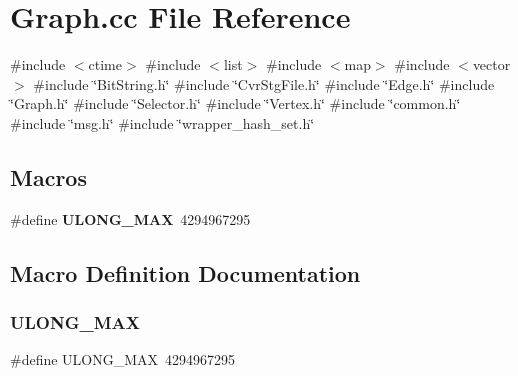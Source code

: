 \section{Graph.\+cc File Reference}
\label{Graph_8cc}
{\ttfamily \#include $<$ctime$>$}\newline
{\ttfamily \#include $<$list$>$}\newline
{\ttfamily \#include $<$map$>$}\newline
{\ttfamily \#include $<$vector$>$}\newline
{\ttfamily \#include \char`\"{}Bit\+String.\+h\char`\"{}}\newline
{\ttfamily \#include \char`\"{}Cvr\+Stg\+File.\+h\char`\"{}}\newline
{\ttfamily \#include \char`\"{}Edge.\+h\char`\"{}}\newline
{\ttfamily \#include \char`\"{}Graph.\+h\char`\"{}}\newline
{\ttfamily \#include \char`\"{}Selector.\+h\char`\"{}}\newline
{\ttfamily \#include \char`\"{}Vertex.\+h\char`\"{}}\newline
{\ttfamily \#include \char`\"{}common.\+h\char`\"{}}\newline
{\ttfamily \#include \char`\"{}msg.\+h\char`\"{}}\newline
{\ttfamily \#include \char`\"{}wrapper\+\_\+hash\+\_\+set.\+h\char`\"{}}\newline
\subsection*{Macros}
\begin{DoxyCompactItemize}
\item 
\#define \textbf{ U\+L\+O\+N\+G\+\_\+\+M\+AX}~4294967295
\end{DoxyCompactItemize}


\subsection{Macro Definition Documentation}
\mbox{\label{Graph_8cc_a41c51926a1997aab3503f9083935e06c}} 
\subsubsection{U\+L\+O\+N\+G\+\_\+\+M\+AX}
{\footnotesize\ttfamily \#define U\+L\+O\+N\+G\+\_\+\+M\+AX~4294967295}

